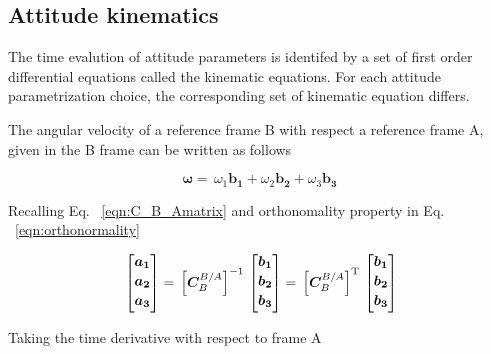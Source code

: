 \subsection{Attitude kinematics}

The time evalution of attitude parameters is identifed by a set of first order 
differential equations called the kinematic equations. For each attitude 
parametrization choice, the corresponding set of kinematic equation differs. 

The angular velocity of a reference frame B with respect a reference frame A, 
given in the B frame can be written as follows

\begin{equation}\label{eqn:quaternion1}
\bm{\omega}
 =\,
\omega_1 \bm{b_1} + \omega_2 \bm{b_2} + \omega_3 \bm{b_3}
\end{equation}

Recalling Eq. ~\ref{eqn:C_B_Amatrix} and orthonomality property in Eq. ~\ref{eqn:orthonormality}

\begin{equation}{\label{eqn:C_B_Amatrix}}
\begin{bmatrix}
\bm{a_1}\\[0.2em]
\bm{a_2}\\[0.2em]
\bm{a_3}\\[0.2em]
\end{bmatrix}
=\,
\Big[{\bm{C}_B^{B/A}}\Big]^{-1}
\,
\begin{bmatrix}
\bm{b_1}\\[0.2em]
\bm{b_2}\\[0.2em]
\bm{b_3}\\[0.2em]
\end{bmatrix}
=\,
\Big[{\bm{C}_B^{B/A}}\Big]^{\rm T}
\,
\begin{bmatrix}
\bm{b_1}\\[0.2em]
\bm{b_2}\\[0.2em]
\bm{b_3}\\[0.2em]
\end{bmatrix}
\end{equation} 

Taking the time derivative with respect to frame A

